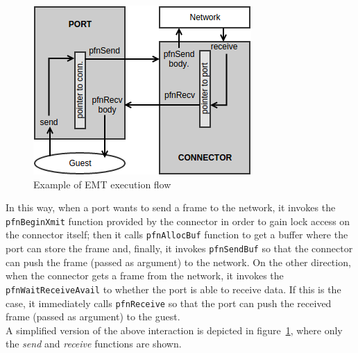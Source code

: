 \documentclass[a4paper, 12pt, titlepage]{report}
\begin{document}
\begin{figure}[!ht]
	\centering
	 	\includegraphics[scale=.75]{img/port_conn_if.png}
	 	\caption{Example of EMT execution flow}
	 	\label{img:port_conn_if}
\end{figure}
In this way, when a port wants to send a frame to the network, it invokes the \texttt{pfnBeginXmit} function provided by the connector in order to gain lock access on the connector itself; then it calls \texttt{pfnAllocBuf} function to get a buffer where the port can store the frame and, finally, it invokes \texttt{pfnSendBuf} so that the connector can push the frame (passed as argument) to the network.
On the other direction, when the connector gets a frame from the network, it invokes the \texttt{pfnWaitReceiveAvail} to whether the port is able to receive data. If this is the case, it immediately calls \texttt{pfnReceive} so that the port can push the received frame (passed as argument) to the guest.
\\
A simplified version of the above interaction is depicted in figure~\ref{img:port_conn_if}, where only the \textit{send} and \textit{receive} functions are shown.
\end{document}

